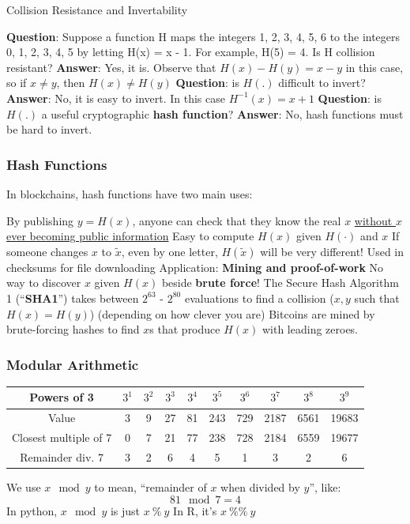 \documentclass[aspectratio=169]{beamer}
\begin{document}
\begin{frame}{Collision Resistance and Invertability}

\textbf{Question}: Suppose a function H maps the integers {1, 2, 3, 4, 5, 6} to the integers {0, 1, 2, 3, 4, 5} by letting H(x) = x - 1. For example, H(5) = 4. Is H collision resistant? \pause 
\vfill 
\textbf{Answer}: Yes, it is. Observe that $H(x) - H(y) = x - y$ in this case, so if $x \ne y$, then $H(x) \ne H(y)$ \pause 
\vfill 
\textbf{Question}: is $H(.)$ difficult to invert? \pause 
\vfill 
\textbf{Answer}: No, it is easy to invert. In this case $H^{-1}(x) = x + 1$ \pause \vfill 
\textbf{Question}: is $H(.)$ a useful cryptographic \textbf{hash function}? \pause 
\vfill 
\textbf{Answer}: No, hash functions must be hard to invert. 
    
\end{frame}


\begin{frame}
\frametitle{Hash Functions}

In blockchains, hash functions have two main uses:

\bi
\m By publishing $y=H(x)$, anyone can check that they know the real $x$ \ul{without $x$ ever becoming public information} \pause 
\bi
\m Easy to compute $H(x)$ given $H(\cdot)$ and $x$ \pause 
\m If someone changes $x$ to $\tilde{x}$, even by one letter, $H(\tilde{x})$ will be very different!
\m Used in checksums for file downloading \pause 
\ei
\m Application: \textbf{Mining and proof-of-work}
\bi 
\m No way to discover $x$ given $H(x)$ beside \textbf{brute force}! \pause 
\m The Secure Hash Algorithm 1 (``\textbf{SHA1}'') takes between $2^{63}$ - $2^{80}$ evaluations to find a collision ($x,y$ such that $H(x)=H(y)$) (depending on how clever you are) \pause 
\m Bitcoins are mined by brute-forcing hashes to find $x$s that produce $H(x)$ with leading zeroes. 
\ei 
\ei

\end{frame}


\begin{frame}
\frametitle{Modular Arithmetic}


\begin{footnotesize}

\centering
\begin{tabular}{|c|c|c|c|c|c|c|c|c|c|}
	\hline 
	Powers of 3 & $3^{1}$ & $3^{2}$ & $3^{3}$ & $3^{4}$ & $3^{5}$ & $3^{6}$ & $3^{7}$ & $3^{8}$ & $3^{9}$\tabularnewline
	\hline 
	Value & 3 & 9 & 27 & 81 & 243 & 729 & 2187 & 6561 & 19683\tabularnewline
	\hline 
	Closest multiple of 7 & 0 & 7 & 21 & 77 & 238 & 728 & 2184 & 6559 & 19677\tabularnewline
	\hline 
	Remainder div. 7 & 3 & 2 & 6 & 4 & 5 & 1 & 3 & 2 & 6\tabularnewline
	\hline 
\end{tabular}
\end{footnotesize}
\bi
\m We use $x\mod y$ to mean, ``remainder of $x$ when divided by $y$'', like:
\[
81\mod7=4
\]
\m In python, $x\mod y$ is just $x\ \%\ y$
\m In R, it's $x\ \%\%\ y$

\ei

\end{frame}
\end{document}
